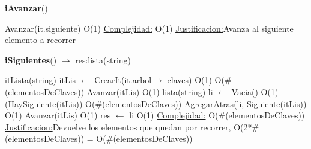 \begin{Algoritmos}
\begin{algorithm}[H]{\textbf{iAvanzar}()}
	\begin{algorithmic}[1]
		\State Avanzar(it.siguiente) \Comment O(1)
		\medskip
		\Statex \underline{Complejidad:} O(1)
			\Statex \underline{Justificacion:}Avanza al siguiente elemento a recorrer
	\end{algorithmic}
\end{algorithm}

\begin{algorithm}[H]{\textbf{iSiguientes}() $\to$ res:lista(string)}
	\begin{algorithmic}[1]
		\State itLista(string) itLis $\gets$ CrearIt(it.arbol$\to$ claves) \Comment O(1)
		 \Comment O($\#$(elementosDeClaves))
			\State Avanzar(itLis) \Comment O(1)
		\EndWhile
		\State lista(string) li $\gets$ Vacia() \Comment O(1)
		\While(HaySiguiente(itLis)) \Comment O($\#$(elementosDeClaves))
			\State AgregarAtras(li, Siguiente(itLis)) \Comment O(1)
			\State Avanzar(itLis) \Comment O(1) 		
		\EndWhile
		\State res $\gets$ li \Comment O(1)
		\medskip
		\Statex \underline{Complejidad:} O($\#$(elementosDeClaves))
			\Statex \underline{Justificacion:}Devuelve los elementos que quedan por recorrer, O(2*$\#$(elementosDeClaves)) = O($\#$(elementosDeClaves))
	\end{algorithmic}
\end{algorithm}

\end{Algoritmos}

